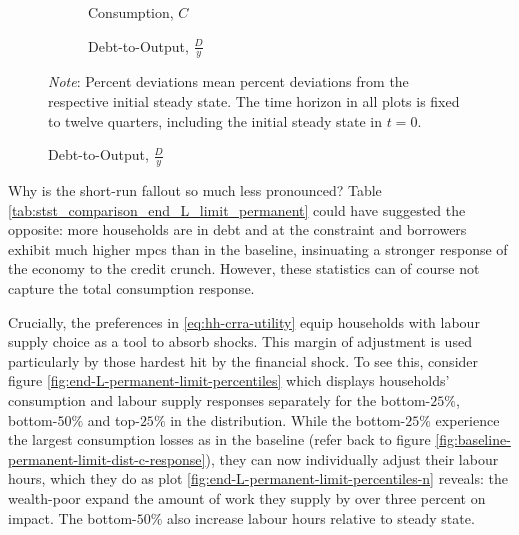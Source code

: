 \documentclass[a4paper,12pt]{article} %
\numberwithin{equation}{section} %
\numberwithin{figure}{section}
\numberwithin{table}{section}
\begin{document}
\begin{figure}[t]
    \centering
    \caption{Endogenous Labour Model -- Shock to Borrowing Limit: Aggregate Dynamics}
    \label{fig:comparison-end-labour-agg}
    \begin{subfigure}[b]{0.49\textwidth}
    \caption{Consumption, $C$}
    \label{fig:comparison-end-labour-c}
         \centering
         
     \end{subfigure}
     \hfill
    \begin{subfigure}[b]{0.49\textwidth}
    \caption{Debt-to-Output, $\frac{D}{y}$}
    \label{fig:comparison-end-labour-DY}
         \centering
         
     \end{subfigure}
     
     \vspace{10pt}
     
     \justifying
     \footnotesize
	\textit{Note}: Percent deviations mean percent deviations from the respective initial steady state. The time horizon in all plots is fixed to twelve quarters, including the initial steady state in $t=0$.
\end{figure}

Why is the short-run fallout so much less pronounced? Table \ref{tab:stst_comparison_end_L_limit_permanent} could have suggested the opposite: more households are in debt and at the constraint and borrowers exhibit much higher \Gls{mpc}s than in the baseline, insinuating a stronger response of the economy to the credit crunch. However, these statistics can of course not capture the total consumption response. 

Crucially, the preferences in \eqref{eq:hh-crra-utility} equip households with labour supply choice as a tool to absorb shocks. This margin of adjustment is used particularly by those hardest hit by the financial shock. To see this, consider figure \ref{fig:end-L-permanent-limit-percentiles} which displays households' consumption and labour supply responses separately for the bottom-$25\%$, bottom-$50\%$ and top-$25\%$ in the distribution. While the bottom-$25\%$ experience the largest consumption losses as in the baseline (refer back to figure \ref{fig:baseline-permanent-limit-dist-c-response}), they can now individually adjust their labour hours, which they do as plot \ref{fig:end-L-permanent-limit-percentiles-n} reveals: the wealth-poor expand the amount of work they supply by over three percent on impact. The bottom-$50\%$ also increase labour hours relative to steady state.
\end{document}
